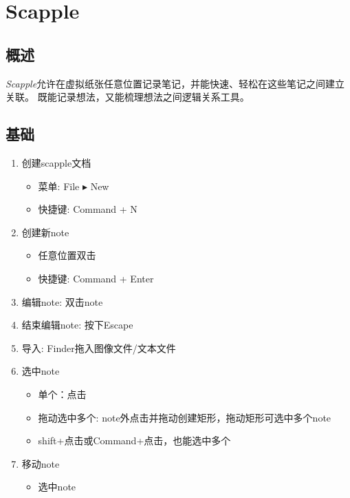 \documentclass{../main.tex}{subfiles}
\begin{document}
\chapter{Scapple}
\section{概述}
\emph{Scapple}允许在虚拟纸张任意位置记录笔记，并能快速、轻松在这些笔记之间建立关联。
既能记录想法，又能梳理想法之间逻辑关系工具。

\section{基础}
\begin{enumerate}[itemsep=0pt, parsep=0pt, topsep=0pt, partopsep=0pt]
  \item 创建scapple文档
    \begin{itemize}[itemsep=0pt, parsep=0pt, topsep=0pt, partopsep=0pt]
      \item 菜单: File $\blacktriangleright$ New
      \item 快捷键: Command + N
    \end{itemize}
  \item 创建新note
    \begin{itemize}[itemsep=0pt, parsep=0pt, topsep=0pt, partopsep=0pt]
      \item 任意位置双击
      \item 快捷键: Command + Enter
    \end{itemize}
  \item 编辑note: 双击note
  \item 结束编辑note: 按下Escape
  \item 导入: Finder拖入图像文件/文本文件
  \item 选中note
    \begin{itemize}[itemsep=0pt, parsep=0pt, topsep=0pt, partopsep=0pt]
      \item 单个：点击
      \item 拖动选中多个: note外点击并拖动创建矩形，拖动矩形可选中多个note
      \item shift+点击或Command+点击，也能选中多个
    \end{itemize}
  \item 移动note
    \begin{itemize}[itemsep=0pt, parsep=0pt, topsep=0pt, partopsep=0pt]
      \item 选中note

\end{itemize}
\end{enumerate}
\end{document}
